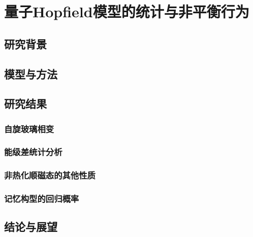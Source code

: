 
\chapter{量子Hopfield模型的统计与非平衡行为}

	\section{研究背景}

	\section{模型与方法}

	\section{研究结果}

		\subsection{自旋玻璃相变}
	
		\subsection{能级差统计分析}
	
		\subsection{非热化顺磁态的其他性质}
	
		\subsection{记忆构型的回归概率}

	\section{结论与展望}
